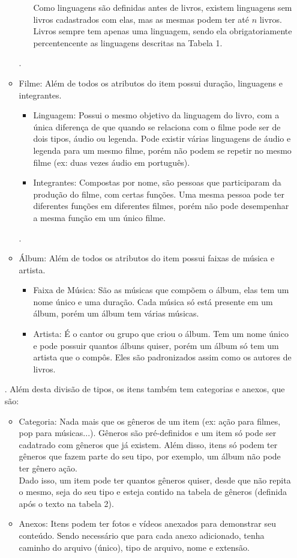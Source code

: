 \documentclass[a4paper, 11pt]{article}
\begin{document}
\begin{itemize}
\begin{itemize}
\begin{itemize}
            Como linguagens são definidas antes de livros, existem linguagens sem livros cadastrados com elas, mas as mesmas podem ter até $n$ livros. Livros sempre tem apenas uma linguagem, sendo ela obrigatoriamente percentencente as linguagens descritas na Tabela 1.
        \end{itemize}.
        \item Filme: Além de todos os atributos do item possui duração, linguagens e integrantes.
        \begin{itemize}
            \item Linguagem: Possui o mesmo objetivo da linguagem do livro, com a única diferença de que quando se relaciona com o filme pode ser de dois tipos, áudio ou legenda. Pode existir várias linguagens de áudio e legenda para um mesmo filme, porém não podem se repetir no mesmo filme (ex: duas vezes áudio em português).
            \item Integrantes: Compostas por nome, são pessoas que participaram da produção do filme, com certas funções. Uma mesma pessoa pode ter diferentes funções em diferentes filmes, porém não pode desempenhar a mesma função em um único filme.
        \end{itemize}.
        \item Álbum: Além de todos os atributos do item possui faixas de música e artista.
        \begin{itemize}
            \item Faixa de Música: São as músicas que compõem o álbum, elas tem um nome único e uma duração. Cada música só está presente em um álbum, porém um álbum tem várias músicas.
            \item Artista: É o cantor ou grupo que criou o álbum. Tem um nome único e pode possuir quantos álbuns quiser, porém um álbum só tem um artista que o compôs. Eles são padronizados assim como os autores de livros.
        \end{itemize}
    \end{itemize}.
    Além desta divisão de tipos, os itens também tem categorias e anexos, que são:
    \begin{itemize}
        \item Categoria: Nada mais que os gêneros de um item (ex: ação para filmes, pop para músicas...). Gêneros são pré-definidos e um item só pode ser cadatrado com gêneros que já existem. Além disso, itens só podem ter gêneros que fazem parte do seu tipo, por exemplo, um álbum não pode ter gênero ação.\\
        Dado isso, um item pode ter quantos gêneros quiser, desde que não repita o mesmo, seja do seu tipo e esteja contido na tabela de gêneros (definida após o texto na tabela 2).
        \item Anexos: Itens podem ter fotos e vídeos anexados para demonstrar seu conteúdo. Sendo necessário que para cada anexo adicionado, tenha caminho do arquivo (único), tipo de arquivo, nome e extensão.
    \end{itemize}
\end{itemize}
\end{document}
